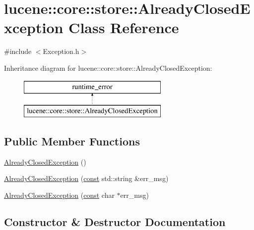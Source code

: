 \hypertarget{classlucene_1_1core_1_1store_1_1AlreadyClosedException}{}\section{lucene\+:\+:core\+:\+:store\+:\+:Already\+Closed\+Exception Class Reference}
\label{classlucene_1_1core_1_1store_1_1AlreadyClosedException}


{\ttfamily \#include $<$Exception.\+h$>$}

Inheritance diagram for lucene\+:\+:core\+:\+:store\+:\+:Already\+Closed\+Exception\+:\begin{figure}[H]
\begin{center}
\leavevmode
\includegraphics[height=2.000000cm]{classlucene_1_1core_1_1store_1_1AlreadyClosedException}
\end{center}
\end{figure}
\subsection*{Public Member Functions}
\begin{DoxyCompactItemize}
\item 
\mbox{\hyperlink{classlucene_1_1core_1_1store_1_1AlreadyClosedException_a30be535362d0a79948fb6e8c284e6fe1}{Already\+Closed\+Exception}} ()
\item 
\mbox{\hyperlink{classlucene_1_1core_1_1store_1_1AlreadyClosedException_a68ac67868d92de75927842d924561752}{Already\+Closed\+Exception}} (\mbox{\hyperlink{ZlibCrc32_8h_a2c212835823e3c54a8ab6d95c652660e}{const}} std\+::string \&err\+\_\+msg)
\item 
\mbox{\hyperlink{classlucene_1_1core_1_1store_1_1AlreadyClosedException_a45d628d17fcaf170f8e66e49eba636cc}{Already\+Closed\+Exception}} (\mbox{\hyperlink{ZlibCrc32_8h_a2c212835823e3c54a8ab6d95c652660e}{const}} char $\ast$err\+\_\+msg)
\end{DoxyCompactItemize}


\subsection{Constructor \& Destructor Documentation}
\mbox{\label{classlucene_1_1core_1_1store_1_1AlreadyClosedException_a30be535362d0a79948fb6e8c284e6fe1}} 
